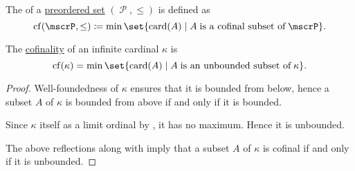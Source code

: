 \begin{definition}\label{def:cofinality}
  The  of a \hyperref[def:preordered_set]{preordered set} \( (\mscrP, \leq) \) is defined as
  \begin{equation*}
    \op{cf}(\mscrP, \leq) \coloneqq \min\set{ \card(A) \given A \T{is a cofinal subset of} \mscrP }.
  \end{equation*}
\end{definition}

\begin{proposition}\label{thm:cardinal_cofinality}
  The \hyperref[def:cofinality]{cofinality} of an infinite cardinal \( \kappa \) is
  \begin{equation*}
    \op{cf}(\kappa) = \min\set{ \card(A) \given A \T{is an unbounded subset of} \kappa }.
  \end{equation*}
\end{proposition}
\begin{proof}
  Well-foundedness of \( \kappa \) ensures that it is bounded from below, hence a subset \( A \) of \( \kappa \) is bounded from above if and only if it is bounded.

  Since \( \kappa \) itself as a limit ordinal by , it has no maximum. Hence it is unbounded.

  The above reflections along with  imply that a subset \( A \) of \( \kappa \) is cofinal if and only if it is unbounded.
\end{proof}

